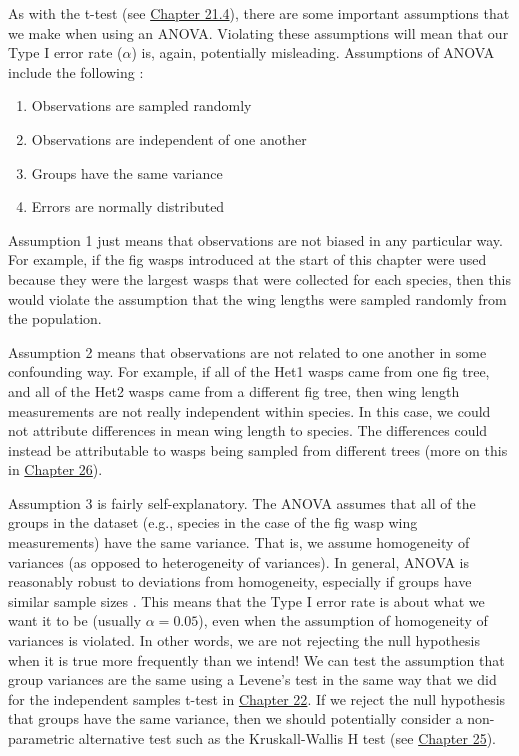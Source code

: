 \documentclass[
]{scrbook}
\providecommand{\tightlist}{%
  \setlength{\itemsep}{0pt}\setlength{\parskip}{0pt}}
\begin{document}
As with the t-test (see \protect\hyperlink{assumptions-of-t-tests}{Chapter 21.4}), there are some important assumptions that we make when using an ANOVA.
Violating these assumptions will mean that our Type I error rate (\(\alpha\)) is, again, potentially misleading.
Assumptions of ANOVA include the following \citep{Box1978, Sokal1995}:

\begin{enumerate}
\def\labelenumi{\arabic{enumi}.}
\tightlist
\item
  Observations are sampled randomly
\item
  Observations are independent of one another
\item
  Groups have the same variance
\item
  Errors are normally distributed
\end{enumerate}

Assumption 1 just means that observations are not biased in any particular way.
For example, if the fig wasps introduced at the start of this chapter were used because they were the largest wasps that were collected for each species, then this would violate the assumption that the wing lengths were sampled randomly from the population.

Assumption 2 means that observations are not related to one another in some confounding way.
For example, if all of the Het1 wasps came from one fig tree, and all of the Het2 wasps came from a different fig tree, then wing length measurements are not really independent within species.
In this case, we could not attribute differences in mean wing length to species.
The differences could instead be attributable to wasps being sampled from different trees (more on this in \protect\hyperlink{Chapter_26}{Chapter 26}).

Assumption 3 is fairly self-explanatory.
The ANOVA assumes that all of the groups in the dataset (e.g., species in the case of the fig wasp wing measurements) have the same variance.
That is, we assume homogeneity of variances (as opposed to heterogeneity of variances).
In general, ANOVA is reasonably robust to deviations from homogeneity, especially if groups have similar sample sizes \citep{Blanca2018}.
This means that the Type I error rate is about what we want it to be (usually \(\alpha = 0.05\)), even when the assumption of homogeneity of variances is violated.
In other words, we are not rejecting the null hypothesis when it is true more frequently than we intend!
We can test the assumption that group variances are the same using a Levene's test in the same way that we did for the independent samples t-test in \protect\hyperlink{independent-samples-t-test-1}{Chapter 22}.
If we reject the null hypothesis that groups have the same variance, then we should potentially consider a non-parametric alternative test such as the Kruskall-Wallis H test (see \protect\hyperlink{Chapter_25}{Chapter 25}).
\end{document}
